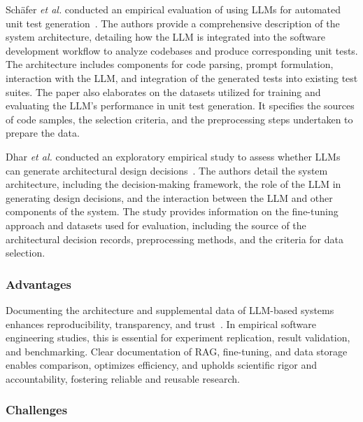 
Sch{\"{a}}fer \textit{et al.} conducted an empirical evaluation of using LLMs for automated unit test generation~\cite{DBLP:journals/tse/SchaferNET24}. The authors provide a comprehensive description of the system architecture, detailing how the LLM is integrated into the software development workflow to analyze codebases and produce corresponding unit tests. The architecture includes components for code parsing, prompt formulation, interaction with the LLM, and integration of the generated tests into existing test suites. The paper also elaborates on the datasets utilized for training and evaluating the LLM's performance in unit test generation. It specifies the sources of code samples, the selection criteria, and the preprocessing steps undertaken to prepare the data.

Dhar \textit{et al.} conducted an exploratory empirical study to assess whether LLMs can generate architectural design decisions~\cite{DBLP:conf/icsa/DharVV24}. The authors detail the system architecture, including the decision-making framework, the role of the LLM in generating design decisions, and the interaction between the LLM and other components of the system. The study provides information on the fine-tuning approach and datasets used for evaluation, including the source of the architectural decision records, preprocessing methods, and the criteria for data selection. 

\subsubsection{Advantages}

Documenting the architecture and supplemental data of LLM-based systems enhances reproducibility, transparency, and trust~\cite{DBLP:journals/software/LuZXXW24}. In empirical software engineering studies, this is essential for experiment replication, result validation, and benchmarking. Clear documentation of RAG, fine-tuning, and data storage enables comparison, optimizes efficiency, and upholds scientific rigor and accountability, fostering reliable and reusable research.

\subsubsection{Challenges}

